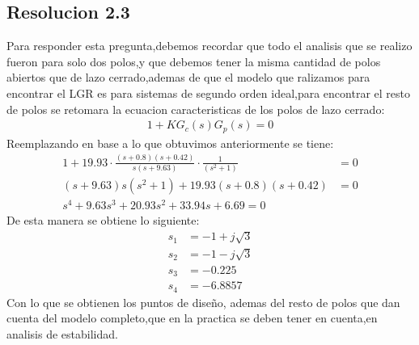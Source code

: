\documentclass[
  11pt,
  letterpaper,
   addpoints,
   answers
  ]{exam}
\begin{document}
\begin{questions}
\begin{solution}
\subsection*{Resolucion 2.3}
Para responder esta pregunta,debemos recordar que todo el analisis que se realizo fueron para solo dos polos,y que debemos tener la misma cantidad de polos abiertos que de lazo cerrado,ademas de que el modelo que ralizamos para encontrar el LGR es para sistemas de segundo orden ideal,para encontrar el resto de polos se retomara la ecuacion caracteristicas de los polos de lazo cerrado:
\begin{align}
    1+KG_{c}(s)G_{p}(s) = 0
\end{align}
Reemplazando en base a lo que obtuvimos anteriormente se tiene:
\begin{align}
    1+ 19.93\cdot \frac{(s+0.8)(s+0.42)}{s(s+9.63)}\cdot \frac{1}{(s^{2}+1)} &= 0\\
    (s+9.63)s(s^{2}+1) + 19.93(s+0.8)(s+0.42) &= 0\\
    s^{4} + 9.63s^{3}+20.93s^{2}+33.94s + 6.69=0
\end{align}
De esta manera se obtiene lo siguiente:
\begin{align}
    s_{1} &= -1+j\sqrt{3}\\
    s_{2} &= -1-j\sqrt{3}\\
    s_{3} &= -0.225\\
    s_{4} &= -6.8857 
\end{align}
Con lo que se obtienen los puntos de diseño, ademas del resto de polos que dan cuenta del modelo completo,que en la practica se deben tener en cuenta,en analisis de estabilidad.

\end{solution}
\end{questions}
\end{document}
